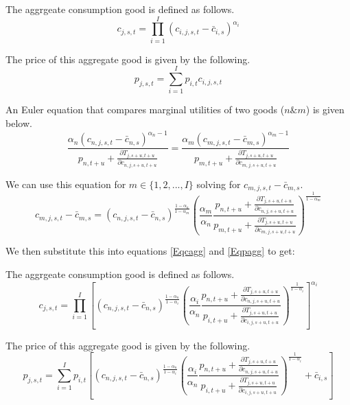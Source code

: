 \documentclass[letterpaper,11pt]{article}
\theoremstyle{definition}
\begin{document}
The aggrgeate consumption good is defined as follows.
\begin{equation} \label{Eqcagg}
    c_{j,s,t}  = \prod_{i=1}^I \left( c_{i,j,s,t} - \bar c_{i,s} \right) ^{\alpha_i} 
\end{equation}

The price of this aggregate good is given by the following.
\begin{equation} \label{Eqpagg}
    p_{j,s,t}  = \sum_{i=1}^I p_{i,t} c_{i,j,s,t} 
\end{equation}

An Euler equation that compares marginal utilities of two goods ($n \& m$) is given below.
\begin{equation}\label{EqcEuler2}
  \frac{ \alpha_n \left( c_{n,j,s,t} - \bar c_{n,s} \right)^{\alpha_n-1} } { p_{n,t+u} + \frac{\partial T_{j,s+u,t+u}}{\partial c_{n,j,s+u,t+u}} } = \frac{ \alpha_m \left( c_{m,j,s,t} - \bar c_{m,s} \right)^{\alpha_m-1} } { p_{m,t+u} + \frac{\partial T_{j,s+u,t+u}}{\partial c_{m,j,s+u,t+u}} }
\end{equation}

We can use this equation for $m \in \{1,2,...,I\}$ solving for $c_{m,j,s,t} - \bar c_{m,s}$.
\begin{equation}
    c_{m,j,s,t} - \bar c_{m,s} = \left(c_{n,j,s,t} - \bar c_{n,s} \right)^{\frac{1-\alpha_n}{1-\alpha_m}} \left(\frac{\alpha_m}{\alpha_n} \frac{ p_{n,t+u} + \frac{\partial T_{j,s+u,t+u}}{\partial c_{n,j,s+u,t+u}} } { p_{m,t+u} + \frac{\partial T_{j,s+u,t+u}}{\partial c_{m,j,s+u,t+u}} } \right)^{\frac{1}{1-\alpha_m}}  \nonumber
\end{equation}

We then substitute this into equations \eqref{Eqcagg} and \eqref{Eqpagg} to get:

The aggrgeate consumption good is defined as follows.
\begin{equation} \label{Eqcagg2}
    c_{j,s,t}  = \prod_{i=1}^I \left[ \left(c_{n,j,s,t} - \bar c_{n,s} \right)^{\frac{1-\alpha_n}{1-\alpha_i}} \left(\frac{\alpha_i}{\alpha_n} \frac{ p_{n,t+u} + \frac{\partial T_{j,s+u,t+u}}{\partial c_{n,j,s+u,t+u}} } { p_{i,t+u} + \frac{\partial T_{j,s+u,t+u}}{\partial c_{i,j,s+u,t+u}} } \right)^{\frac{1}{1-\alpha_i}} \right] ^{\alpha_i} 
\end{equation}

The price of this aggregate good is given by the following.
\begin{equation} \label{Eqpagg2}
    p_{j,s,t}  = \sum_{i=1}^I p_{i,t} \left[ \left(c_{n,j,s,t} - \bar c_{n,s} \right)^{\frac{1-\alpha_n}{1-\alpha_i}} \left(\frac{\alpha_i}{\alpha_n} \frac{ p_{n,t+u} + \frac{\partial T_{j,s+u,t+u}}{\partial c_{n,j,s+u,t+u}} } { p_{i,t+u} + \frac{\partial T_{j,s+u,t+u}}{\partial c_{i,j,s+u,t+u}} } \right)^{\frac{1}{1-\alpha_i}} + \bar c_{i,s} \right] 
\end{equation}
\end{document}
